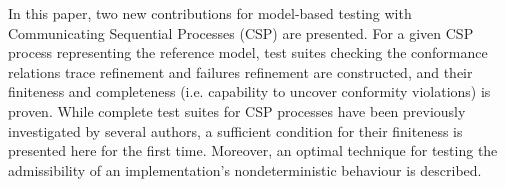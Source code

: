 In this paper, two new contributions for model-based testing  
with   Communicating Sequential Processes (CSP) are presented. 
For a given CSP process representing the reference model, test suites 
checking the conformance relations 
trace refinement and  failures refinement are constructed, and their finiteness
and completeness (i.e. capability to uncover conformity violations) is proven. While complete test suites for CSP processes have been previously investigated by several authors, a sufficient condition for their finiteness is presented here for the first time. Moreover, an optimal technique for
testing the admissibility of an implementation's nondeterministic behaviour is described. 